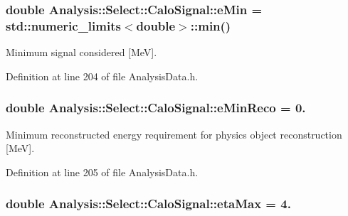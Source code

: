 \subsubsection[{\texorpdfstring{e\+Min}{eMin}}]{\setlength{\rightskip}{0pt plus 5cm}double Analysis\+::\+Select\+::\+Calo\+Signal\+::e\+Min = std\+::numeric\+\_\+limits$<$double$>$\+::min()\hspace{0.3cm}{\ttfamily [static]}}\hypertarget{namespaceAnalysis_1_1Select_1_1CaloSignal_a1a58695e9774b4a545d92fca555eb0c0}{}\label{namespaceAnalysis_1_1Select_1_1CaloSignal_a1a58695e9774b4a545d92fca555eb0c0}


Minimum signal considered \mbox{[}MeV\mbox{]}. 



Definition at line 204 of file Analysis\+Data.\+h.

\subsubsection[{\texorpdfstring{e\+Min\+Reco}{eMinReco}}]{\setlength{\rightskip}{0pt plus 5cm}double Analysis\+::\+Select\+::\+Calo\+Signal\+::e\+Min\+Reco = 0.\hspace{0.3cm}{\ttfamily [static]}}\hypertarget{namespaceAnalysis_1_1Select_1_1CaloSignal_afe6b59ea6218484d4f8d976594af5cba}{}\label{namespaceAnalysis_1_1Select_1_1CaloSignal_afe6b59ea6218484d4f8d976594af5cba}


Minimum reconstructed energy requirement for physics object reconstruction \mbox{[}MeV\mbox{]}. 



Definition at line 205 of file Analysis\+Data.\+h.

\subsubsection[{\texorpdfstring{eta\+Max}{etaMax}}]{\setlength{\rightskip}{0pt plus 5cm}double Analysis\+::\+Select\+::\+Calo\+Signal\+::eta\+Max = 4.\hspace{0.3cm}{\ttfamily [static]}}\hypertarget{namespaceAnalysis_1_1Select_1_1CaloSignal_a24fdf3ac5549dff1f349eb1cb4146352}{}\label{namespaceAnalysis_1_1Select_1_1CaloSignal_a24fdf3ac5549dff1f349eb1cb4146352}


